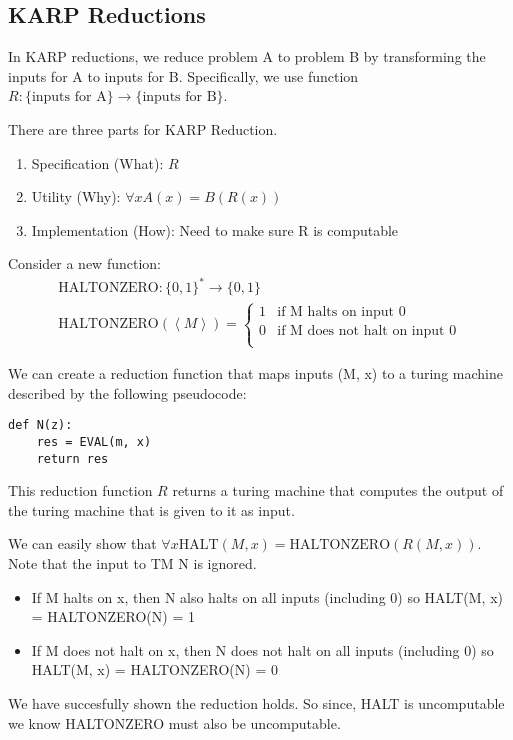 \subsection*{KARP Reductions}
In KARP reductions, we reduce problem A to problem B by transforming the inputs for A to inputs for B. Specifically, we use function $R: \{\text{inputs for A}\} \rightarrow \{ \text{inputs for B}\}$.

There are three parts for KARP Reduction.
\begin{enumerate}
    \item Specification (What): $R$
    \item Utility (Why): $\forall x A(x) = B(R(x))$
    \item Implementation (How): Need to make sure R is computable
\end{enumerate}

Consider a new function:
\begin{gather*}
    \text{HALTONZERO}: \{0,1\}^* \rightarrow \{0,1\} \\
    \text{HALTONZERO}(\left<M\right>) = \begin{cases}
        1 & \text{if M halts on input 0} \\
        0 & \text{if M does not halt on input 0} \\
    \end{cases}
\end{gather*}

We can create a reduction function that maps inputs (M, x) to a turing machine described by the following pseudocode:
\begin{verbatim}
def N(z):
    res = EVAL(m, x)
    return res
\end{verbatim}
This reduction function $R$ returns a turing machine that computes the output of the turing machine that is given to it as input.

\pagebreak
We can easily show that $\forall x \text{HALT}(M, x) = \text{HALTONZERO}(R(M,x))$. Note that the input to TM N is ignored.
\begin{itemize}
    \item If M halts on x, then N also halts on all inputs (including 0) so HALT(M, x) = HALTONZERO(N) = 1
    \item If M does not halt on x, then N does not halt on all inputs (including 0) so HALT(M, x) = HALTONZERO(N) = 0
\end{itemize}

We have succesfully shown the reduction holds. So since, HALT is uncomputable we know HALTONZERO must also be uncomputable.